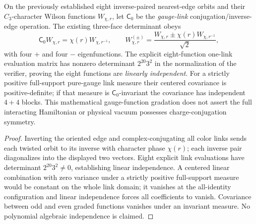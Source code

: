 \documentclass[12pt,a4paper]{article}
\begin{document}
\begin{proposition}
\label{p10:prop:v366-hurwitz-wilson-conjugation-grading}
On the previously established eight inverse-paired nearest-edge
orbits and their $C_3$-character Wilson functions $W_{\chi,r}$,
let $\mathsf C_0$ be the \emph{gauge-link} conjugation/inverse-edge
operation.  The existing three-face determinant obeys
\[
 \mathsf C_0 W_{\chi,r}=\chi(r)W_{\chi,r^{-1}},\qquad
 W^{(\pm)}_{\chi,r}=
 \frac{W_{\chi,r}\pm\chi(r)W_{\chi,r^{-1}}}{\sqrt2},
\]
with four $+$ and four $-$ eigenfunctions.
The explicit eight-function one-link evaluation matrix has
nonzero determinant $2^{20}3^2$ in the normalization of the
verifier, proving the eight functions are \emph{linearly
independent}.  For a strictly positive full-support pure-gauge
link measure their centered covariance is positive-definite;
if that measure is $\mathsf C_0$-invariant the covariance has
independent $4+4$ blocks.  This mathematical gauge-function
gradation does not assert the full interacting Hamiltonian or
physical vacuum possesses charge-conjugation symmetry.
\end{proposition}
\begin{proof}
Inverting the oriented edge and complex-conjugating all color
links sends each twisted orbit to its inverse with character phase
$\chi(r)$; each inverse pair diagonalizes into the displayed two
vectors.  Eight explicit link evaluations have determinant
$2^{20}3^2\ne0$, establishing linear independence.  A centered
linear combination with zero variance under a strictly positive
full-support measure would be constant on the whole link domain;
it vanishes at the all-identity configuration and linear
independence forces all coefficients to vanish.  Covariance
between odd and even graded functions vanishes under an invariant
measure.  No polynomial algebraic independence is claimed.
\end{proof}
\end{document}
